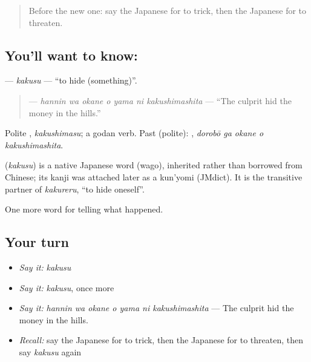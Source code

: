 \begin{quote}
Before the new one: say the Japanese for to trick, then the Japanese for to threaten.
\end{quote}

\subsection*{You'll want to know: }
\textbf{} — \emph{kakusu} — \textquotedblleft{}to hide (something)\textquotedblright{}.

\begin{quote}
\textbf{   } — \emph{hannin wa okane o yama ni kakushimashita} — \textquotedblleft{}The culprit hid the money in the hills.\textquotedblright{}
\end{quote}

Polite \textbf{}, \emph{kakushimasu}; a godan verb. Past (polite): \textbf{  }, \emph{dorobō ga okane o kakushimashita}.

\begin{cousinweb}
\textbf{} (\emph{kakusu}) is a native Japanese word (wago), inherited rather than borrowed from Chinese; its kanji was attached later as a kun'yomi (JMdict). It is the transitive partner of \emph{kakureru}, \textquotedblleft{}to hide oneself\textquotedblright{}.
\end{cousinweb}

\begin{grammarlens}[title={What you've built}]
One more word for telling what happened.
\end{grammarlens}

\subsection*{Your turn}
\begin{itemize}
\raggedright
  \item \emph{Say it:} \emph{kakusu}
  \item \emph{Say it:} \emph{kakusu}, once more
  \item \emph{Say it:} \emph{hannin wa okane o yama ni kakushimashita} — The culprit hid the money in the hills.
  \item \emph{Recall:} say the Japanese for to trick, then the Japanese for to threaten, then say \emph{kakusu} again
\end{itemize}

